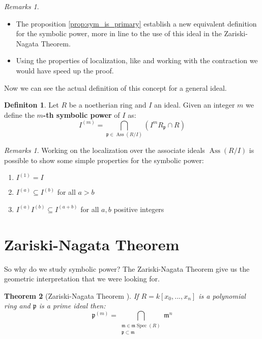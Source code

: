 \documentclass[notitlepage, a4]{book}
\theoremstyle{plain}
\newtheorem{teo}{Theorem}[section]
\theoremstyle{remark}
\newtheorem{rems}[rem]{Remarks}
\theoremstyle{definition}
\newtheorem{deff}[teo]{Definiton}
\newcommand{\p}{\mathfrak{p}}
\newcommand{\mm}{\mathfrak{m}}
\DeclareMathOperator{\Ass}{Ass}
\DeclareMathOperator{\Spec}{Spec}
\begin{document}
	\begin{rems}
		\begin{itemize}
		\item The proposition \ref{prop:sym_is_primary} establish a new equivalent definition for the symbolic power, more in line to the use of this ideal in the Zariski-Nagata Theorem.
		\item Using the properties of localization, like \cite[Proposition 4.8]{AMCD} and working with the contraction we would have speed up the proof.
		\end{itemize}
	\end{rems}
	
Now we can see the actual definition of this concept for a general ideal.

\begin{deff}
	Let $ R $ be a noetherian ring and $ I $ an ideal. Given an integer $ m $ we define the \textbf{$ m $-th symbolic power} of $ I $ as:
	\begin{equation}\label{eq:sym_pow_def}
		I^{(m)} = \bigcap_{\p \in \Ass(R/I) } (I^m R_\p \cap R)
	\end{equation}
\end{deff}

\begin{rems} \label{rem:symb_basic}
Working on the localization over the associate ideals $ \Ass(R/I) $ is possible to show some simple properties for the symbolic power:
\begin{enumerate}
\item $ I^{(1)}=I $
\item $ I^{(a)} \subseteq I^{(b)} $ for all $ a > b $
\item $ I^{(a)}I^{(b)}\subseteq I^{(a+b)} $ for all $ a,b $ positive integers
\end{enumerate}
\end{rems}



\section{Zariski-Nagata Theorem}
So why do we study symbolic power? The Zariski-Nagata Theorem give us the geometric interpretation that we were looking for.

\begin{teo}[Zariski-Nagata Theorem \cite{Zar49, Nagata62}] \label{teo:zarnaga}
	If $ R = k[x_0 , ... , x_n] $ is a polynomial ring and $ \p $ is a prime ideal then:
	\begin{equation}\label{eq:zar_nag_teo}
	\p^{(m)} = \bigcap_{\substack{ \mm \in \mm \Spec (R)\\ \p \subset \mm}} \mm ^n
	\end{equation}
\end{teo}
\end{document}
